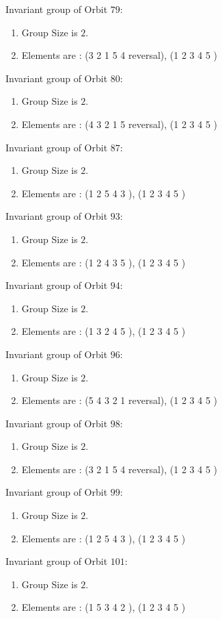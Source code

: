 \documentclass[12pt]{article}
\begin{document}
Invariant group of Orbit $79$:
\begin{enumerate}
\item Group Size is $2$.
\item Elements are : (3 2 1 5 4   reversal), (1 2 3 4 5  )
\end{enumerate}
Invariant group of Orbit $80$:
\begin{enumerate}
\item Group Size is $2$.
\item Elements are : (4 3 2 1 5   reversal), (1 2 3 4 5  )
\end{enumerate}
Invariant group of Orbit $87$:
\begin{enumerate}
\item Group Size is $2$.
\item Elements are : (1 2 5 4 3  ), (1 2 3 4 5  )
\end{enumerate}
Invariant group of Orbit $93$:
\begin{enumerate}
\item Group Size is $2$.
\item Elements are : (1 2 4 3 5  ), (1 2 3 4 5  )
\end{enumerate}
Invariant group of Orbit $94$:
\begin{enumerate}
\item Group Size is $2$.
\item Elements are : (1 3 2 4 5  ), (1 2 3 4 5  )
\end{enumerate}
Invariant group of Orbit $96$:
\begin{enumerate}
\item Group Size is $2$.
\item Elements are : (5 4 3 2 1   reversal), (1 2 3 4 5  )
\end{enumerate}
Invariant group of Orbit $98$:
\begin{enumerate}
\item Group Size is $2$.
\item Elements are : (3 2 1 5 4   reversal), (1 2 3 4 5  )
\end{enumerate}
Invariant group of Orbit $99$:
\begin{enumerate}
\item Group Size is $2$.
\item Elements are : (1 2 5 4 3  ), (1 2 3 4 5  )
\end{enumerate}
Invariant group of Orbit $101$:
\begin{enumerate}
\item Group Size is $2$.
\item Elements are : (1 5 3 4 2  ), (1 2 3 4 5  )
\end{enumerate}
\end{document}
